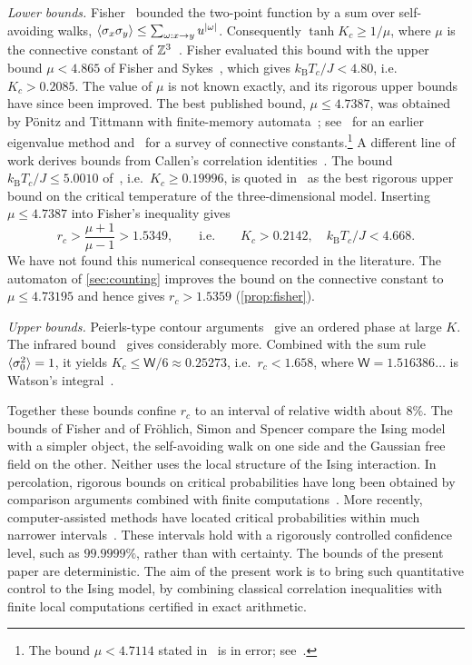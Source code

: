 \emph{Lower bounds.} Fisher~\cite{Fis67} bounded the two-point function by a sum over self-avoiding walks, $\langle \sigma_x\sigma_y\rangle\le\sum_{\omega:x\to y}u^{|\omega|}$. Consequently $\tanh K_c\ge1/\mu$, where $\mu$ is the connective constant of $\mathbb Z^3$~\cite{Fis67,PS19}. Fisher evaluated this bound with the upper bound $\mu<4.865$ of Fisher and Sykes~\cite{FS59}, which gives $k_{\mathrm B}T_c/J<4.80$, i.e.\ $K_c>0.2085$. The value of $\mu$ is not known exactly, and its rigorous upper bounds have since been improved. The best published bound, $\mu\le4.7387$, was obtained by P\"onitz and Tittmann with finite-memory automata~\cite{PT00}; see~\cite{Alm93} for an earlier eigenvalue method and~\cite{GL19} for a survey of connective constants.\footnote{The bound $\mu<4.7114$ stated in~\cite{MJHMJG00} is in error; see~\cite[Sect.~7.2]{CLS07}.} A different line of work derives bounds from Callen's correlation identities~\cite{SBO83,Vig85}. The bound $k_{\mathrm B}T_c/J\le5.0010$ of~\cite{Vig85}, i.e.\ $K_c\ge0.19996$, is quoted in~\cite{BLU17} as the best rigorous upper bound on the critical temperature of the three-dimensional model. Inserting $\mu\le4.7387$ into Fisher's inequality gives
\[
 r_c>\frac{\mu+1}{\mu-1}>1.5349,\qquad\text{i.e.}\qquad K_c>0.2142,\quad k_{\mathrm B}T_c/J<4.668 .
\]
We have not found this numerical consequence recorded in the literature. The automaton of \cref{sec:counting} improves the bound on the connective constant to $\mu\le4.73195$ and hence gives $r_c>1.5359$ (\cref{prop:fisher}).

\emph{Upper bounds.} Peierls-type contour arguments~\cite{Pei36,Gri64,WGF67} give an ordered phase at large $K$. The infrared bound~\cite{FSS76} gives considerably more. Combined with the sum rule $\langle \sigma_0^2\rangle=1$, it yields $K_c\le\mathsf W/6\approx0.25273$, i.e.\ $r_c<1.658$, where $\mathsf W=1.516386\ldots$ is Watson's integral~\cite{Wat39}.

Together these bounds confine $r_c$ to an interval of relative width about $8\%$. The bounds of Fisher and of Fr\"ohlich, Simon and Spencer compare the Ising model with a simpler object, the self-avoiding walk on one side and the Gaussian free field on the other. Neither uses the local structure of the Ising interaction. In percolation, rigorous bounds on critical probabilities have long been obtained by comparison arguments combined with finite computations~\cite{vdBE96}. More recently, computer-assisted methods have located critical probabilities within much narrower intervals~\cite{BBW05,RW07}. These intervals hold with a rigorously controlled confidence level, such as $99.9999\%$, rather than with certainty. The bounds of the present paper are deterministic. The aim of the present work is to bring such quantitative control to the Ising model, by combining classical correlation inequalities with finite local computations certified in exact arithmetic.

